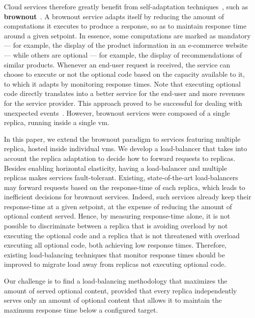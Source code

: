 Cloud services therefore greatly benefit from self-adaptation
techniques~\cite{SalehieSelfadaptive:TAAS}, such as {\bf
  brownout}~\citep{cloudish-tr}. A brownout service adapts itself by
reducing the amount of computations it executes to produce a response,
so as to maintain response time around a given setpoint.  In essence,
some computations are marked as mandatory --- for example, the display
of the product information in an e-commerce website --- while others
are optional --- for example, the display of recommendations of
similar products.  Whenever an end-user request is received, the
service can choose to execute or not the optional code based on the
capacity available to it, to which it adapts by monitoring response
times. Note that executing optional code directly translates into a
better service for the end-user and more revenues for the service
provider. This approach proved to be successful for dealing with
unexpected events~\citep{cloudish-tr}. However, brownout services were
composed of a single replica, running inside a single \ac{vm}.

In this paper, we extend the brownout paradigm to services featuring
multiple replica, hosted inside individual \acp{vm}. We develop a
load-balancer that takes into account the replica adaptation to decide
how to forward requests to replicas.  Besides enabling horizontal
elasticity, having a load-balancer and multiple replicas makes
services fault-tolerant. Existing, state-of-the-art load-balancers may
forward requests based on the response-time of each replica, which
leads to inefficient decisions for brownout services.  Indeed, such
services already keep their response-time at a given setpoint, at the
expense of reducing the amount of optional content served. Hence, by
measuring response-time alone, it is not possible to discriminate
between a replica that is avoiding overload by not executing the
optional code and a replica that is not threatened with overload
executing all optional code, both achieving low response times.
Therefore, existing load-balancing techniques that monitor response
times should be improved to migrate load away from replicas not
executing optional code.

Our challenge is to find a load-balancing methodology that maximizes
the amount of served optional content, provided that every replica
independently serves only an amount of optional content that allows it
to maintain the maximum response time below a configured target.

